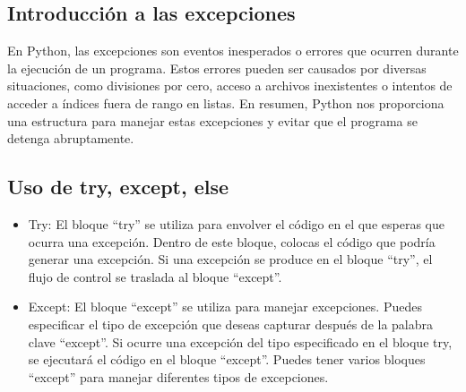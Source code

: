 \subsection{Introducción a las excepciones}
En Python, las excepciones son eventos inesperados o errores que ocurren durante la ejecución de un programa. Estos errores pueden ser causados por diversas situaciones, como divisiones por cero, acceso a archivos inexistentes o intentos de acceder a índices fuera de rango en listas. En resumen, Python nos proporciona una estructura para manejar estas excepciones y evitar que el programa se detenga abruptamente.

\subsection{Uso de try, except, else}
\begin{itemize}
    \item Try: El bloque ``try'' se utiliza para envolver el código en el que esperas que ocurra una excepción. Dentro de este bloque, colocas el código que podría generar una excepción. Si una excepción se produce en el bloque ``try'', el flujo de control se traslada al bloque ``except''.
    \item Except: El bloque ``except'' se utiliza para manejar excepciones. Puedes especificar el tipo de excepción que deseas capturar después de la palabra clave ``except''. Si ocurre una excepción del tipo especificado en el bloque try, se ejecutará el código en el bloque ``except''. Puedes tener varios bloques ``except'' para manejar diferentes tipos de excepciones.
    \begin{figure}[h]
        \centering
      \end{figure}
    

\end{itemize}
